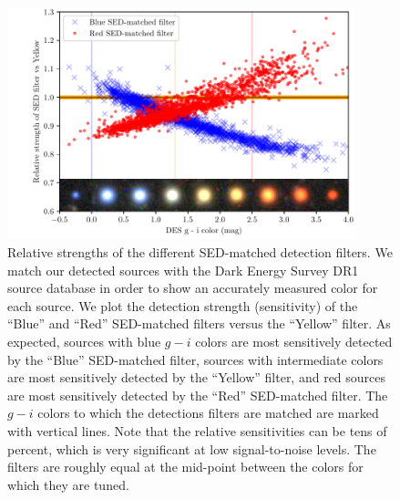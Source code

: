\documentclass[letterpaper,preprint]{aastex62}
\begin{document}
\begin{figure}
  \begin{center}
    \includegraphics[width=0.9\textwidth]{strength}
    \caption{Relative strengths of the different SED-matched detection
      filters.  We match our detected sources with the Dark Energy
      Survey DR1 source database in order to show an accurately
      measured color for each source.  We plot the detection strength
      (sensitivity) of the ``Blue'' and ``Red'' SED-matched filters
      versus the ``Yellow'' filter.  As expected, sources with blue
      $g-i$ colors are most sensitively detected by the ``Blue''
      SED-matched filter, sources with intermediate colors are most
      sensitively detected by the ``Yellow'' filter, and red sources
      are most sensitively detected by the ``Red'' SED-matched filter.
      The $g-i$ colors to which the detections filters are matched are
      marked with vertical lines.  Note that the relative
      sensitivities can be tens of percent, which is very significant
      at low signal-to-noise levels.  The filters are roughly equal at
      the mid-point between the colors for which they are tuned.
      \label{fig:strength}}
  \end{center}
\end{figure}
\end{document}
